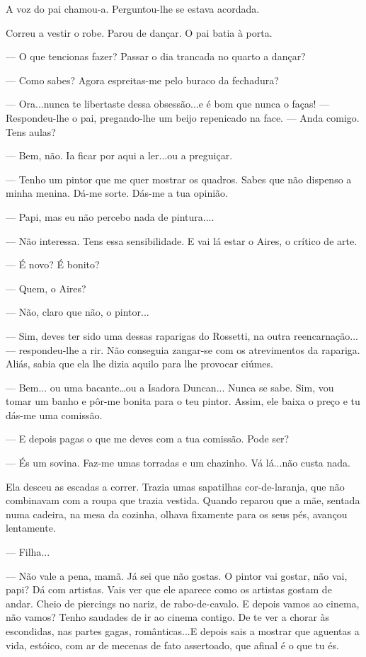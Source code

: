 A voz do pai chamou-a. Perguntou-lhe se estava acordada.

Correu a vestir o robe. Parou de dançar. O pai batia à porta.

--- O que tencionas fazer? Passar o dia trancada no quarto a dançar?

--- Como sabes? Agora espreitas-me pelo buraco da fechadura?

--- Ora...nunca te libertaste dessa obsessão...e é bom que nunca o faças!
--- Respondeu-lhe o pai, pregando-lhe um beijo repenicado na face. --- Anda
comigo. Tens aulas?

--- Bem, não. Ia ficar por aqui a ler...ou a preguiçar.

--- Tenho um pintor que me quer mostrar os quadros. Sabes que não dispenso
a minha menina. Dá-me sorte. Dás-me a tua opinião.

--- Papi, mas eu não percebo nada de pintura....

--- Não interessa. Tens essa sensibilidade. E vai lá estar o Aires, o
crítico de arte.

--- É novo? É bonito?

--- Quem, o Aires?

--- Não, claro que não, o pintor...

--- Sim, deves ter sido uma dessas raparigas do Rossetti, na outra
reencarnação... --- respondeu-lhe a rir. Não conseguia zangar-se com os
atrevimentos da rapariga. Aliás, sabia que ela lhe dizia aquilo para lhe
provocar ciúmes.

--- Bem... ou uma bacante\ldots{}ou a Isadora Duncan... Nunca se sabe. Sim,
vou tomar um banho e pôr-me bonita para o teu pintor. Assim, ele baixa o
preço e tu dás-me uma comissão.

--- E depois pagas o que me deves com a tua comissão. Pode ser?

--- És um sovina. Faz-me umas torradas e um chazinho. Vá lá...não custa
nada.

Ela desceu as escadas a correr. Trazia umas sapatilhas cor-de-laranja,
que não combinavam com a roupa que trazia vestida. Quando reparou que a
mãe, sentada numa cadeira, na mesa da cozinha, olhava fixamente para os
seus pés, avançou lentamente.

--- Filha...

--- Não vale a pena, mamã. Já sei que não gostas. O pintor vai gostar, não
vai, papi? Dá com artistas. Vais ver que ele aparece como os artistas
gostam de andar. Cheio de piercings no nariz, de rabo-de-cavalo. E
depois vamos ao cinema, não vamos? Tenho saudades de ir ao cinema
contigo. De te ver a chorar às escondidas, nas partes gagas,
românticas...E depois sais a mostrar que aguentas a vida, estóico, com
ar de mecenas de fato assertoado, que afinal é o que tu és.

